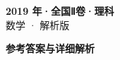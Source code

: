 \documentclass[zihao=-4, a4paper]{ctexart}
\begin{document}
\begin{center}
  {\Large\bfseries 2019 年·全国Ⅱ卷·理科}\\[4pt]
  {\large 数学 · 解析版}
\end{center}
\medskip
{}

\clearpage
{}
\begin{center}{\Large\bfseries 参考答案与详细解析}\end{center}
\medskip

\end{document}
